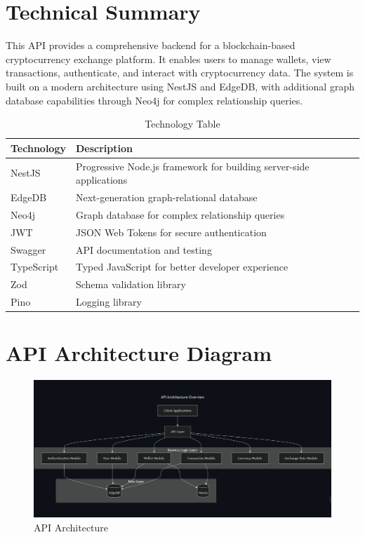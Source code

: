 \section{Technical Summary}
This API provides a comprehensive backend for a blockchain-based cryptocurrency exchange platform. It enables users to manage wallets, view transactions, authenticate, and interact with cryptocurrency data. The system is built on a modern architecture using NestJS and EdgeDB, with additional graph database capabilities through Neo4j for complex relationship queries.
\begin{table}[htbp]
\centering
\renewcommand{\arraystretch}{1.3}
\setlength{\tabcolsep}{12pt}
\begin{tabular}{|l|p{}|}
\hline
\textbf{Technology} & \textbf{Description} \\
\hline
NestJS & Progressive Node.js framework for building server-side applications \\
\hline
EdgeDB & Next-generation graph-relational database \\
\hline
Neo4j & Graph database for complex relationship queries \\
\hline
JWT & JSON Web Tokens for secure authentication \\
\hline
Swagger & API documentation and testing \\
\hline
TypeScript & Typed JavaScript for better developer experience \\
\hline
Zod & Schema validation library \\
\hline
Pino & Logging library \\
\hline
\end{tabular}
\caption{Technology Table}
\end{table}

\newpage
\section{API Architecture Diagram}
\begin{figure}[h]
    \centering
    \includegraphics[width=\textwidth, keepaspectratio]{figures/api_architecture.png}
    \caption{API Architecture}
    \label{fig:api_architecture}
\end{figure}

